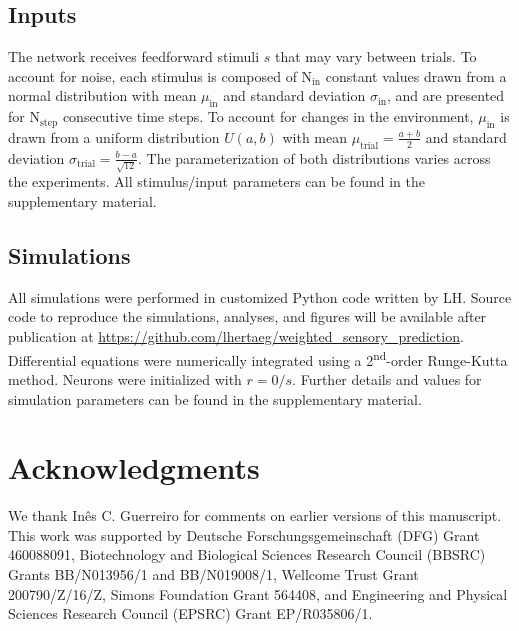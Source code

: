 \documentclass[10pt,a4paper]{article}
\begin{document}
\subsection*{Inputs}
%
The network receives feedforward stimuli $s$ that may vary between trials. To account for noise, each stimulus is composed of N$_\mathrm{in}$ constant values drawn from a normal distribution with mean $\mu_\mathrm{in}$ and standard deviation $\sigma_\mathrm{in}$, and are presented for N$_\mathrm{step}$ consecutive time steps. To account for changes in the environment, $\mu_\mathrm{in}$ is drawn from a uniform distribution $U(a,b)$ with mean $\mu_\mathrm{trial} = \frac{a+b}{2}$ and standard deviation $\sigma_\mathrm{trial} = \frac{b-a}{\sqrt{12}}$. The parameterization of both distributions varies across the experiments. All stimulus/input parameters can be found in the supplementary material.

\subsection*{Simulations}
%
All simulations were performed in customized Python code written by LH. Source code to reproduce the simulations, analyses, and figures will be available after publication at \url{https://github.com/lhertaeg/weighted_sensory_prediction}. Differential equations were numerically integrated using a 2\textsuperscript{nd}-order Runge-Kutta method. Neurons were initialized with $r=0/s$. Further details and values for simulation parameters can be found in the supplementary material.


\section*{Acknowledgments}
%
We thank In\^es C. Guerreiro for comments on earlier versions of this manuscript. This work was supported by Deutsche Forschungsgemeinschaft (DFG) Grant 460088091, Biotechnology and Biological Sciences Research Council (BBSRC) Grants BB/N013956/1 and BB/N019008/1, Wellcome Trust Grant 200790/Z/16/Z, Simons Foundation Grant 564408, and Engineering and Physical Sciences Research Council (EPSRC) Grant EP/R035806/1.







\end{document}
